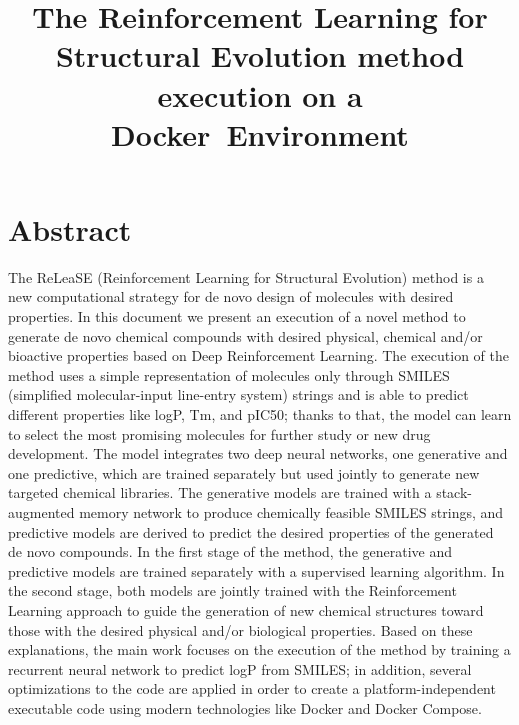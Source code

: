 \documentclass[a4paper]{article}
\begin{document}
\title{The Reinforcement Learning for Structural Evolution method execution on a Docker Environment}


\author{
}
\date{} %

\maketitle

\section*{Abstract}
The ReLeaSE (Reinforcement Learning for Structural Evolution) \cite{reinforcement-learning} method is a new computational strategy for de novo design of molecules with desired properties.
In this document we present an execution of a novel method to generate de novo chemical compounds with desired physical, chemical and/or bioactive properties based on Deep Reinforcement Learning. The execution of the method uses a simple representation of molecules only through SMILES (simplified molecular-input line-entry system) strings and is able to predict different properties like logP, Tm, and pIC50; thanks to that, the model can learn to select the most promising molecules for further study or new drug development. 
The model integrates two deep neural networks, one generative and one predictive, which are trained separately but used jointly to generate new targeted chemical libraries. The generative models are trained with a stack-augmented memory network to produce chemically feasible SMILES strings, and predictive models are derived to predict the desired properties of the generated de novo compounds. In the first stage of the method, the generative and predictive models are trained separately with a supervised learning algorithm. In the second stage, both models are jointly trained with the Reinforcement Learning approach to guide the generation of new chemical structures toward those with the desired physical and/or biological properties.
Based on these explanations, the main work focuses on the execution of the method by training a recurrent neural network to predict logP from SMILES; in addition, several optimizations to the code are applied in order to create a platform-independent executable code using modern technologies like Docker and Docker Compose.
\end{document}
